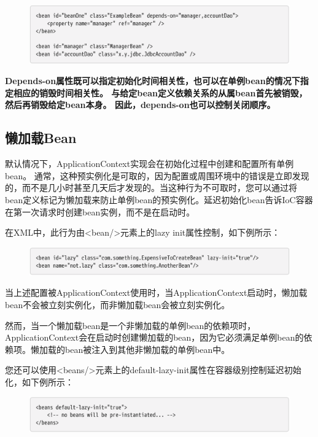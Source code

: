 \begin{figure}[ht]
    \centering
    \includegraphics[width=1\linewidth]{./Figure/56.png}
\end{figure}

\textbf{Depends-on属性既可以指定初始化时间相关性，也可以在单例bean的情况下指定相应的销毁时间相关性。 与给定bean定义依赖关系的从属bean首先被销毁，然后再销毁给定bean本身。 因此，depends-on也可以控制关闭顺序。}

\subsection{懒加载Bean}

默认情况下，ApplicationContext实现会在初始化过程中创建和配置所有单例bean。
通常，这种预实例化是可取的，因为配置或周围环境中的错误是立即发现的，而不是几小时甚至几天后才发现的。当这种行为不可取时，您可以通过将bean定义标记为懒加载来防止单例bean的预实例化。延迟初始化bean告诉IoC容器在第一次请求时创建bean实例，而不是在启动时。

在XML中，此行为由<bean/>元素上的lazy init属性控制，如下例所示：

\begin{figure}[ht]
    \centering
    \includegraphics[width=1\linewidth]{./Figure/57.png}
\end{figure}

当上述配置被ApplicationContext使用时，当ApplicationContext启动时，懒加载bean不会被立刻实例化，而非懒加载bean会被立刻实例化。

然而，当一个懒加载bean是一个非懒加载的单例bean的依赖项时，ApplicationContext会在启动时创建懒加载的bean，因为它必须满足单例bean的依赖项。懒加载的bean被注入到其他非懒加载的单例bean中。

您还可以使用<beans/>元素上的default-lazy-init属性在容器级别控制延迟初始化，如下例所示：

\begin{figure}[ht]
    \centering
    \includegraphics[width=1\linewidth]{./Figure/58.png}
\end{figure}

